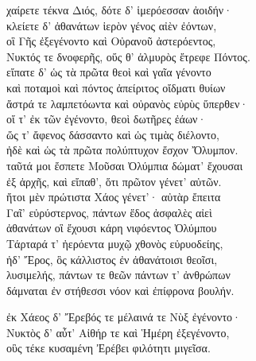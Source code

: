 \begin{pages}
\begin{Leftside}
\quad{}χαίρετε τέκνα Διός, δότε δ' ἱμερόεσσαν ἀοιδήν· \\
κλείετε δ' ἀθανάτων ἱερὸν γένος αἰὲν ἐόντων, \\
οἳ Γῆς ἐξεγένοντο καὶ Οὐρανοῦ ἀστερόεντος,\\
Νυκτός τε δνοφερῆς, οὕς θ' ἁλμυρὸς ἔτρεφε Πόντος.\\
εἴπατε δ' ὡς τὰ πρῶτα θεοὶ καὶ γαῖα γένοντο \\
καὶ ποταμοὶ καὶ πόντος ἀπείριτος οἴδματι θυίων \\
ἄστρά τε λαμπετόωντα καὶ οὐρανὸς εὐρὺς ὕπερθεν·  \\
οἵ τ' ἐκ τῶν ἐγένοντο, θεοὶ δωτῆρες ἐάων· \\
ὥς τ' ἄφενος δάσσαντο καὶ ὡς τιμὰς διέλοντο, \\
ἠδὲ καὶ ὡς τὰ πρῶτα πολύπτυχον ἔσχον Ὄλυμπον.\\
ταῦτά μοι ἔσπετε Μοῦσαι Ὀλύμπια δώματ' ἔχουσαι \\
ἐξ ἀρχῆς, καὶ εἴπαθ', ὅτι πρῶτον γένετ' αὐτῶν. \\

\quad{}ἤτοι μὲν πρώτιστα Χάος γένετ'· αὐτὰρ ἔπειτα\\
Γαῖ' εὐρύστερνος, πάντων ἕδος ἀσφαλὲς αἰεὶ\\
ἀθανάτων οἳ ἔχουσι κάρη νιφόεντος Ὀλύμπου \\
Τάρταρά τ' ἠερόεντα μυχῷ χθονὸς εὐρυοδείης,\\
ἠδ' Ἔρος, ὃς κάλλιστος ἐν ἀθανάτοισι θεοῖσι, \\
λυσιμελής, πάντων τε θεῶν πάντων τ' ἀνθρώπων\\
δάμναται ἐν στήθεσσι νόον καὶ ἐπίφρονα βουλήν.\\

\smallskip
\begin{center}\end{center}
\smallskip

ἐκ Χάεος δ' Ἔρεβός τε μέλαινά τε Νὺξ ἐγένοντο· \\
Νυκτὸς δ' αὖτ' Αἰθήρ τε καὶ Ἡμέρη ἐξεγένοντο,\\
οὓς τέκε κυσαμένη Ἐρέβει φιλότητι μιγεῖσα. \\

\smallskip
\begin{center}\end{center}
\smallskip


\end{Leftside}
\end{pages}
